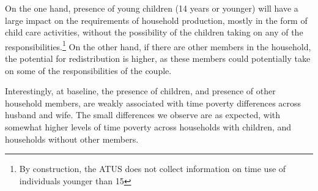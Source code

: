\documentclass[
  11pt,
]{article}
\begin{document}
On the one hand, presence of young children (14 years or younger) will
have a large impact on the requirements of household production, mostly
in the form of child care activities, without the possibility of the
children taking on any of the responsibilities.\footnote{By
  construction, the ATUS does not collect information on time use of
  individuals younger than 15} On the other hand, if there are other
members in the household, the potential for redistribution is higher, as
these members could potentially take on some of the responsibilities of
the couple.

Interestingly, at baseline, the presence of children, and presence of
other household members, are weakly associated with time poverty
differences across husband and wife. The small differences we observe
are as expected, with somewhat higher levels of time poverty across
households with children, and households without other members.

\begin{table}

\caption{\label{tbl-tb3}Time Poverty by Household Structure}


\end{table}%
\end{document}
